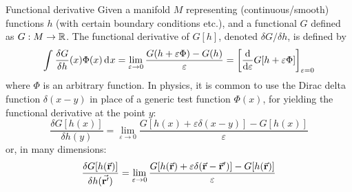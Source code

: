 \documentclass[../../Main/Main.tex]{subfiles}
\begin{document}
\begin{definition}{Functional derivative}{}
Given a manifold \( M \)  representing (continuous/smooth) functions \( h \)  (with certain boundary conditions etc.), and a functional \( G \)  defined as \( G: M \rightarrow \mathbb{R} \).
The functional derivative of \( G[h] \), denoted \( \delta G/\delta h \), is defined by
\begin{equation*}
  \int_{}^{}  \frac{\delta G }{\delta h}\qty(x) \Phi  (x) \dd[]{x}
= \lim_{\varepsilon \rightarrow 0} \frac{G \qty(h  +  \varepsilon \Phi  )- G(h)}{\varepsilon }
=\qty[ \dv{}{\varepsilon }  G[ h + \varepsilon \Phi  ]]_{\varepsilon =0}
\end{equation*}
where \( \Phi  \) is an arbitrary function.
In physics, it is common to use the Dirac delta function \( \delta (x-y) \) in place of a generic test function \( \Phi (x) \), for yielding the functional derivative at the point \( y \):
\begin{equation*}
\frac{\delta G [h(x)] }{\delta h(y)}  = \lim_{\varepsilon \rightarrow 0}
\frac{G [h(x) + \varepsilon \delta (x-y) ] - G[h(x)]}{\varepsilon }
\end{equation*}
or, in many dimensions:
\begin{equation}
\frac{\delta G [h(\va{r})] }{\delta h(\va{r'})}  = \lim_{\varepsilon \rightarrow 0}
\frac{G [h(\va{r}) + \varepsilon \delta (\va{r}-\va{r}') ] - G[h(\va{r})]}{\varepsilon }
\end{equation}

\end{definition}
\end{document}
